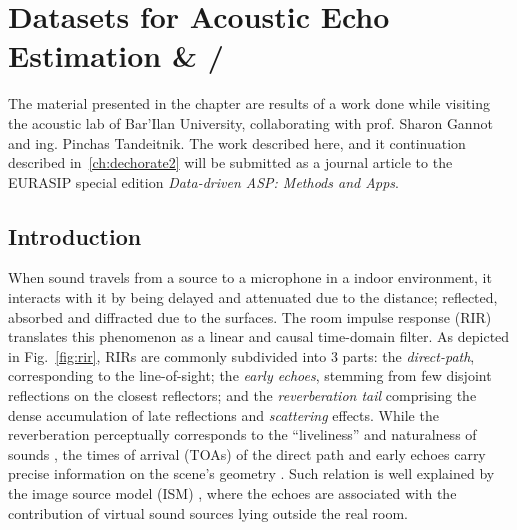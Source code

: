 \chapter{Datasets for Acoustic Echo Estimation \& \DECHORATE/}\label{ch:dechorate}

\vspace{-2.5em}

 \synopsisChDechorate


The material presented in the chapter are results of a work done while visiting the acoustic lab of Bar'Ilan University, collaborating with prof. Sharon Gannot and ing. Pinchas Tandeitnik.
The work described here, and it continuation described in~\cref{ch:dechorate2} will be submitted as a journal article to the EURASIP special edition \textit{Data-driven ASP: Methods and Apps}.

\section{Introduction}\label{sec:dechorate:intro}

When sound travels from a source to a microphone in a indoor environment, it interacts with it by being delayed and attenuated due to the distance; reflected, absorbed and diffracted due to the surfaces. The room impulse response (RIR) translates this phenomenon as a linear and causal time-domain filter.
As depicted in Fig.~\ref{fig:rir}, RIRs are commonly subdivided into 3 parts:
the \textit{direct-path}, corresponding to the line-of-sight; the \textit{early echoes}, stemming from few disjoint reflections on the closest reflectors; and the \textit{reverberation tail} comprising the dense accumulation of late reflections and  \textit{scattering} effects. While the reverberation perceptually corresponds to the ``liveliness'' and naturalness of sounds , the times of arrival (TOAs) of the direct path and early echoes carry precise information on the scene's geometry . Such relation is well explained by the image source model (ISM) , where the echoes are associated with the contribution of virtual sound sources lying outside the real room.

